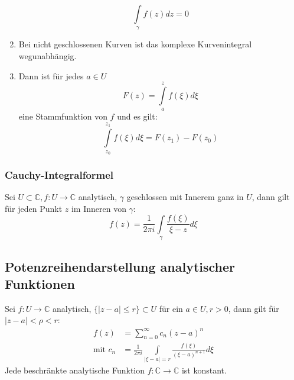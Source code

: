 \documentclass[4pt,a4paper]{scrartcl}
\begin{document}
\begin{multicols}{4}
\begin{enumerate}[label=$\bullet$]
\begin{equation*}
\int\limits_{\gamma}f(z)dz=0
\end{equation*}
\item Bei nicht geschlossenen Kurven ist das komplexe Kurvenintegral wegunabhängig.
\item Dann ist für jedes $a\in U$
\begin{equation*}
F(z)=\int\limits_a^zf(\xi)d\xi
\end{equation*}
eine Stammfunktion von $f$ und es gilt:
\begin{equation*}
\int\limits_{z_0}^{z_1}f(\xi)d\xi=F(z_1)-F(z_0)
\end{equation*}
\end{enumerate}

\subsubsection{Cauchy-Integralformel}
Sei $U\subset\mathbb{C},f:U\rightarrow\mathbb{C}$ analytisch, $\gamma$ geschlossen mit Innerem ganz in $U$, dann gilt für jeden Punkt $z$ im Inneren von $\gamma$:
\begin{equation*}
f(z)=\frac{1}{2\pi i}\int\limits_{\gamma}\frac{f(\xi)}{\xi -z}d\xi
\end{equation*}

\subsection{Potenzreihendarstellung analytischer Funktionen}
Sei $f:U\rightarrow\mathbb{C}$ analytisch, $\{|z-a|\leq r\}\subset U$ für ein $a\in U,r>0$, dann gilt für $|z-a|<\rho<r$:
\begin{equation*}
\begin{split}
f(z)&=\sum\limits_{n=0}^{\infty}c_n(z-a)^n\\
\text{mit }c_n&=\frac{1}{2\pi i}\int\limits_{|\xi- a|=r}\frac{f(\xi)}{(\xi -a)^{n+1}}d\xi
\end{split}
\end{equation*}
Jede beschränkte analytische Funktion $f:\mathbb{C}\rightarrow\mathbb{C}$ ist konstant.


\end{multicols}
\end{document}
